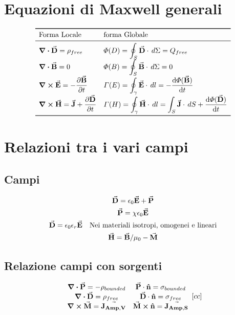 \documentclass[a4paper]{scrarticle}
\begin{document}
    
\section{Equazioni di Maxwell generali}

\[
\begin{array}{ll}
    \toprule
    \text{Forma Locale} & \text {forma Globale} \\
    \midrule
    \displaystyle \div{\va D} = \rho_{free}             & \displaystyle \varPhi(D)   = \oint_S \va D \cdot \, d\Sigma= Q_{free}\\
    \displaystyle \div{\va B} = 0                       & \displaystyle \varPhi(B)   = \oint_S \va B \cdot \, d\Sigma= 0\\
    \displaystyle \curl{\va E}= -\pdv{\va B}{t}         & \displaystyle \varGamma(E) = \oint_\gamma \va E \cdot \,dl = -\dv{\varPhi(\va B)}{t}\\
    \displaystyle \curl{\va H}= \va J +  \pdv{\va D}{t} & \displaystyle \varGamma(H) = \oint_\gamma \va H \cdot \,dl = \int_S \va J \cdot \,dS + \dv{\varPhi(\va D)}{t}\\
    \bottomrule
\end{array}    
\]

\section{Relazioni tra i vari campi}

\subsection{Campi}

\begin{gather}
    \va D = \epsilon_0 \va E + \va P\\
    \va P = \chi\epsilon_0 \va E \\
    \va D = \epsilon_0 \epsilon_r \va E \quad \text{Nei materiali isotropi, omogenei e lineari}\\
    \va H = \va B/\mu_0 - \va M
\end{gather}

\subsection{Relazione campi con sorgenti}
\[
\begin{array}{cc}
    \div {\va P} = - \rho_{bounded} &
    \va P \cdot  \vu n = \sigma_{bounded}\\
    \div {\va D} = \rho_{free} &
    \va D \cdot  \vu n = \sigma_{free}\\
    \curl {\va M} = \va {J_{Amp, V}} &
    \va M \cross \vu n = \va {J_{Amp, S}}
\end{array}[cc]
\]
\end{document}
